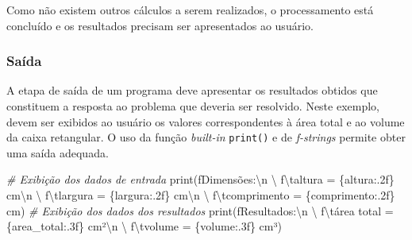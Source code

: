 \documentclass[
]{book}
\newenvironment{Shaded}{\begin{snugshade}}{\end{snugshade}}
\newcommand{\BuiltInTok}[1]{#1}
\newcommand{\CharTok}[1]{\textcolor[rgb]{0.31,0.60,0.02}{#1}}
\newcommand{\CommentTok}[1]{\textcolor[rgb]{0.56,0.35,0.01}{\textit{#1}}}
\newcommand{\NormalTok}[1]{#1}
\newcommand{\SpecialCharTok}[1]{\textcolor[rgb]{0.00,0.00,0.00}{#1}}
\newcommand{\SpecialStringTok}[1]{\textcolor[rgb]{0.31,0.60,0.02}{#1}}
\begin{document}
Como não existem outros cálculos a serem realizados, o processamento está concluído e os resultados precisam ser apresentados ao usuário.

\hypertarget{sauxedda-1}{%
\subsubsection{Saída}\label{sauxedda-1}}

A etapa de saída de um programa deve apresentar os resultados obtidos que constituem a resposta ao problema que deveria ser resolvido. Neste exemplo, devem ser exibidos ao usuário os valores correspondentes à área total e ao volume da caixa retangular. O uso da função \emph{built-in} \texttt{print()} e de \emph{f-strings} permite obter uma saída adequada.

\begin{Shaded}
\begin{Highlighting}[]
\CommentTok{\# Exibição dos dados de entrada}
\BuiltInTok{print}\NormalTok{(}\SpecialStringTok{f\textquotesingle{}Dimensões:}\CharTok{\textbackslash{}n}\SpecialStringTok{\textquotesingle{}}\NormalTok{ \textbackslash{}}
    \SpecialStringTok{f\textquotesingle{}}\CharTok{\textbackslash{}t}\SpecialStringTok{altura = }\SpecialCharTok{\{}\NormalTok{altura}\SpecialCharTok{:.2f\}}\SpecialStringTok{ cm}\CharTok{\textbackslash{}n}\SpecialStringTok{\textquotesingle{}}\NormalTok{ \textbackslash{}}
    \SpecialStringTok{f\textquotesingle{}}\CharTok{\textbackslash{}t}\SpecialStringTok{largura = }\SpecialCharTok{\{}\NormalTok{largura}\SpecialCharTok{:.2f\}}\SpecialStringTok{ cm}\CharTok{\textbackslash{}n}\SpecialStringTok{\textquotesingle{}}\NormalTok{ \textbackslash{}}
    \SpecialStringTok{f\textquotesingle{}}\CharTok{\textbackslash{}t}\SpecialStringTok{comprimento = }\SpecialCharTok{\{}\NormalTok{comprimento}\SpecialCharTok{:.2f\}}\SpecialStringTok{ cm\textquotesingle{}}\NormalTok{)}
\CommentTok{\# Exibição dos dados dos resultados}
\BuiltInTok{print}\NormalTok{(}\SpecialStringTok{f\textquotesingle{}Resultados:}\CharTok{\textbackslash{}n}\SpecialStringTok{\textquotesingle{}}\NormalTok{ \textbackslash{}}
    \SpecialStringTok{f\textquotesingle{}}\CharTok{\textbackslash{}t}\SpecialStringTok{área total = }\SpecialCharTok{\{}\NormalTok{area\_total}\SpecialCharTok{:.3f\}}\SpecialStringTok{ cm²}\CharTok{\textbackslash{}n}\SpecialStringTok{\textquotesingle{}}\NormalTok{ \textbackslash{}}
    \SpecialStringTok{f\textquotesingle{}}\CharTok{\textbackslash{}t}\SpecialStringTok{volume = }\SpecialCharTok{\{}\NormalTok{volume}\SpecialCharTok{:.3f\}}\SpecialStringTok{ cm³\textquotesingle{}}\NormalTok{)}
\end{Highlighting}
\end{Shaded}
\end{document}
